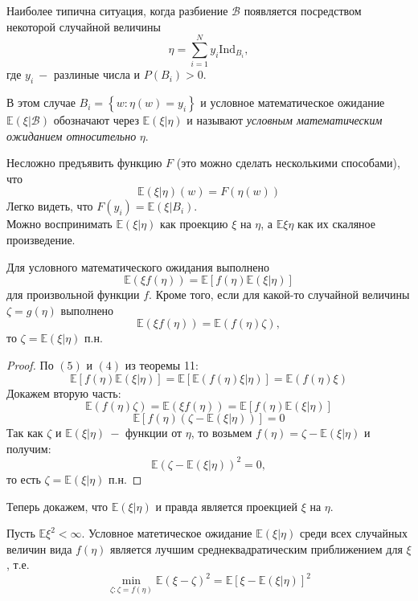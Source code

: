Наиболее типична ситуация, когда разбиение $\mathcal{B}$ появляется посредством некоторой случайной величины
\[
    \eta = \sum_{i = 1}^{N} y_i \text{Ind}_{B_i},
\]
где $y_i \ - $ разлиные числа и $P\left(B_i\right) > 0$.
\begin{definition}
В этом случае $B_i = \left\{w : \eta\left(w\right) = y_i\right\}$ и условное математическое ожидание $\mathbb{E}\left(\xi | \mathcal{B}\right)$ обозначают через $\mathbb{E}\left(\xi| \eta\right)$ и называют \textit{условным математическим ожиданием относительно} $\eta$.

\end{definition}
Несложно предъявить функцию $F$ (это можно сделать несколькими способами), что 
\[
    \mathbb{E}\left(\xi | \eta\right)\left(w\right) = F\left(\eta\left(w\right)\right)
\]
Легко видеть, что $F\left(y_i\right) = \mathbb{E}\left(\xi | B_i\right)$.
\\
Можно воспринимать $\mathbb{E}\left(\xi | \eta\right)$ как проекцию $\xi$ на $\eta$, а $\mathbb{E} \xi \eta$ как их скаляное произведение.
\begin{lemma}
Для условного математического ожидания выполнено
\[
    \mathbb{E}\left(\xi f\left(\eta\right)\right) = \mathbb{E}\left[f\left(\eta\right)\mathbb{E}\left(\xi | \eta\right)\right]
\]
для произвольной функции $f$. Кроме того, если для какой-то случайной величины $\zeta = g\left(\eta\right)$ выполнено 
\[
    \mathbb{E}\left(\xi f\left(\eta\right)\right) = \mathbb{E}\left(f\left(\eta\right) \zeta\right),
\]
то $\zeta = \mathbb{E}\left(\xi | \eta\right)$ п.н.
\end{lemma}

\begin{proof}
По $(5)$ и $(4)$ из теоремы 11:
\[
    \mathbb{E}\left[f\left(\eta\right) \mathbb{E}\left(\xi | \eta\right)\right] =
    \mathbb{E} \left[\mathbb{E}\left(f\left(\eta\right) \xi | \eta\right)\right] = \mathbb{E}\left(f\left(\eta\right) \xi\right)
\]
Докажем вторую часть: 
\[
    \mathbb{E} \left(f\left(\eta\right) \zeta\right) = \mathbb{E}\left(\xi f\left(\eta\right)\right) = \mathbb{E}\left[f\left(\eta\right)\mathbb{E}\left(\xi | \eta\right)\right]
\]
\[
    \mathbb{E} \left[f\left(\eta\right) \left(\zeta - \mathbb{E}\left(\xi | \eta \right)\right)\right] = 0
\]
Так как $\zeta$ и $\mathbb{E}\left(\xi | \eta\right) \ -$ функции от $\eta$, то возьмем $f\left(\eta\right) = \zeta - \mathbb{E}\left(\xi | \eta \right)$ и получим:
\[
    \mathbb{E} \left(\zeta - \mathbb{E}\left(\xi | \eta \right)\right)^ 2 = 0,
\]
то есть $\zeta = \mathbb{E}\left(\xi | \eta\right)$ п.н.
\end{proof}
Теперь докажем, что $\mathbb{E}\left(\xi | \eta\right)$ и правда является проекцией $\xi$ на $\eta$.
\begin{advice}

Пусть $\mathbb{E} \xi ^ 2 < \infty$. Условное матетическое ожидание $\mathbb{E}\left(\xi | \eta\right)$ среди всех случайных величин вида $f\left(\eta\right)$ является лучшим среднеквадратическим приближением для $\xi$, т.е.
\[
    \min_{\zeta : \zeta = f\left(\eta\right)} \mathbb{E} \left(\xi - \zeta\right) ^ 2 = \mathbb{E} \left[\xi - \mathbb{E}\left(\xi | \eta\right)\right] ^ 2
\]
\end{advice}

